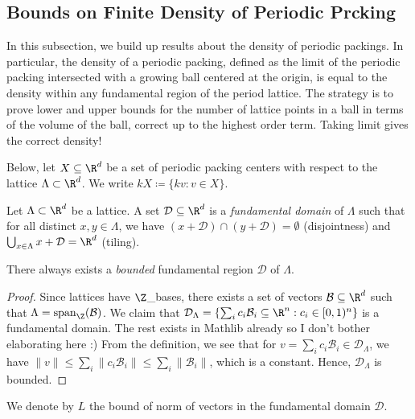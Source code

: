 \subsection{Bounds on Finite Density of Periodic Prcking}

In this subsection, we build up results about the density of periodic packings. In particular, the density of a periodic packing, defined as the limit of the periodic packing intersected with a growing ball centered at the origin, is equal to the density within any fundamental region of the period lattice. The strategy is to prove lower and upper bounds for the number of lattice points in a ball in terms of the volume of the ball, correct up to the highest order term. Taking limit gives the correct density!

Below, let $X \subseteq \R^d$ be a set of periodic packing centers with respect to the lattice $\Lambda \subset \R^d$. We write $kX \coloneqq \{kv : v \in X\}$.

\begin{definition}\label{fd}\lean{}\uses{}
  Let $\Lambda \subset \R^d$ be a lattice. A set $\mathcal{D} \subseteq \R^d$ is a \emph{fundamental domain} of $\Lambda$ such that for all distinct $x, y \in \Lambda$, we have $(x + \mathcal{D}) \cap (y + \mathcal{D}) = \emptyset$ (disjointness) and $\bigcup_{x \in \Lambda} x + \mathcal{D} = \R^d$ (tiling).
\end{definition}

\begin{lemma}\label{exists_bounded_fd}\lean{}
  There always exists a \emph{bounded} fundamental region $\mathcal{D}$ of $\Lambda$.
\end{lemma}
\begin{proof}
  Since lattices have $\Z$_bases, there exists a set of vectors $\mathcal{B} \subseteq \R^d$ such that $\Lambda = \mathrm{span}_{\Z}(\mathcal{B})$. We claim that $\mathcal{D}_{\Lambda} = \{\sum_i c_i\mathcal{B}_i \subseteq \R^n : c_i \in [0, 1)^n\}$ is a fundamental domain. The rest exists in Mathlib already so I don't bother elaborating here :) From the definition, we see that for $v = \sum_i c_i\mathcal{B}_i \in \mathcal{D}_{\Lambda}$, we have $\|v\| \leq \sum_i \|c_i\mathcal{B}_i\| \leq \sum_i \|\mathcal{B}_i\|$, which is a constant. Hence, $\mathcal{D}_{\Lambda}$ is bounded.
\end{proof}

We denote by $L$ the bound of norm of vectors in the fundamental domain $\mathcal{D}$.

